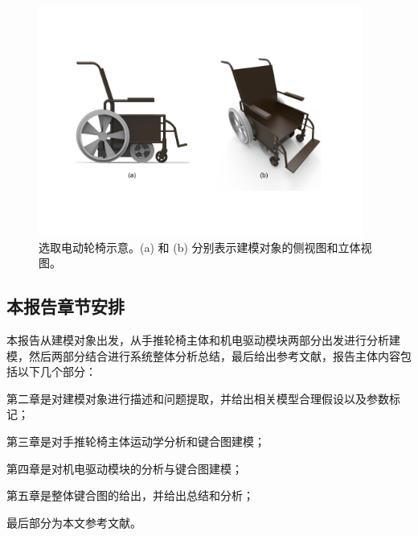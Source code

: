 \begin{figure}[!h]
	\centering
	\includegraphics[width=0.95\textwidth]{fig/PW_rendering.pdf}
	\caption{选取电动轮椅示意。(a) 和 (b) 分别表示建模对象的侧视图和立体视图。}\label{fig:PW_rendering}
\end{figure}

\subsection{本报告章节安排}

本报告从建模对象出发，从手推轮椅主体和机电驱动模块两部分出发进行分析建模，然后两部分结合进行系统整体分析总结，最后给出参考文献，报告主体内容包括以下几个部分：

第二章是对建模对象进行描述和问题提取，并给出相关模型合理假设以及参数标记；

第三章是对手推轮椅主体运动学分析和键合图建模；

第四章是对机电驱动模块的分析与键合图建模；

第五章是整体键合图的给出，并给出总结和分析；

最后部分为本文参考文献。
